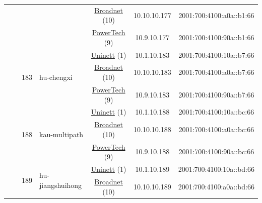 \begin{small}
\begin{center}
\begin{longtable}{|c|c|c|c|c|c|c|c|}
  &  &  &  & \multicolumn{2}{|c|}{\tiny{\href{https://www.broadnet.no}{Broadnet} (10)}} & \tiny{10.10.10.177} & \tiny{2001:700:4100:a0a::b1:66} \\* \cline{5-5}\cline{6-6}\cline{7-7}\cline{8-8}
  &  &  &  & \multicolumn{2}{|c|}{\tiny{\href{http://www.powertech.no}{PowerTech} (9)}} & \tiny{10.9.10.177} & \tiny{2001:700:4100:90a::b1:66} \\* \cline{3-3}\cline{4-4}\cline{5-5}\cline{6-6}\cline{7-7}\cline{8-8}
  &  & \multirow{3}{*}{\tiny{183}} & \multicolumn{1}{|l|}{\multirow{3}{*}{\tiny{hu-chengxi}}} & \multicolumn{2}{|c|}{\tiny{\href{https://www.uninett.no}{Uninett} (1)}} & \tiny{10.1.10.183} & \tiny{2001:700:4100:10a::b7:66} \\* \cline{5-5}\cline{6-6}\cline{7-7}\cline{8-8}
  &  &  &  & \multicolumn{2}{|c|}{\tiny{\href{https://www.broadnet.no}{Broadnet} (10)}} & \tiny{10.10.10.183} & \tiny{2001:700:4100:a0a::b7:66} \\* \cline{5-5}\cline{6-6}\cline{7-7}\cline{8-8}
  &  &  &  & \multicolumn{2}{|c|}{\tiny{\href{http://www.powertech.no}{PowerTech} (9)}} & \tiny{10.9.10.183} & \tiny{2001:700:4100:90a::b7:66} \\* \cline{3-3}\cline{4-4}\cline{5-5}\cline{6-6}\cline{7-7}\cline{8-8}
  &  & \multirow{3}{*}{\tiny{188}} & \multicolumn{1}{|l|}{\multirow{3}{*}{\tiny{kau-multipath}}} & \multicolumn{2}{|c|}{\tiny{\href{https://www.uninett.no}{Uninett} (1)}} & \tiny{10.1.10.188} & \tiny{2001:700:4100:10a::bc:66} \\* \cline{5-5}\cline{6-6}\cline{7-7}\cline{8-8}
  &  &  &  & \multicolumn{2}{|c|}{\tiny{\href{https://www.broadnet.no}{Broadnet} (10)}} & \tiny{10.10.10.188} & \tiny{2001:700:4100:a0a::bc:66} \\* \cline{5-5}\cline{6-6}\cline{7-7}\cline{8-8}
  &  &  &  & \multicolumn{2}{|c|}{\tiny{\href{http://www.powertech.no}{PowerTech} (9)}} & \tiny{10.9.10.188} & \tiny{2001:700:4100:90a::bc:66} \\* \cline{3-3}\cline{4-4}\cline{5-5}\cline{6-6}\cline{7-7}\cline{8-8}
  &  & \multirow{3}{*}{\tiny{189}} & \multicolumn{1}{|l|}{\multirow{3}{*}{\tiny{hu-jiangshuihong}}} & \multicolumn{2}{|c|}{\tiny{\href{https://www.uninett.no}{Uninett} (1)}} & \tiny{10.1.10.189} & \tiny{2001:700:4100:10a::bd:66} \\* \cline{5-5}\cline{6-6}\cline{7-7}\cline{8-8}
  &  &  &  & \multicolumn{2}{|c|}{\tiny{\href{https://www.broadnet.no}{Broadnet} (10)}} & \tiny{10.10.10.189} & \tiny{2001:700:4100:a0a::bd:66} \\* \cline{5-5}\cline{6-6}\cline{7-7}\cline{8-8}

\end{longtable}
\end{center}
\end{small}
